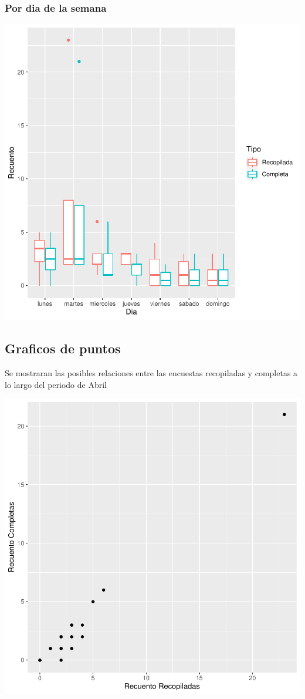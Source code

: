 \documentclass{article}
\begin{document}
\subsubsection{Por dia de la semana}

\includegraphics{seguimento2-074}

\subsection{Graficos de puntos}
Se mostraran las posibles relaciones entre las encuestas recopiladas y completas a lo largo del periodo de Abril

\includegraphics{seguimento2-075}
\end{document}
